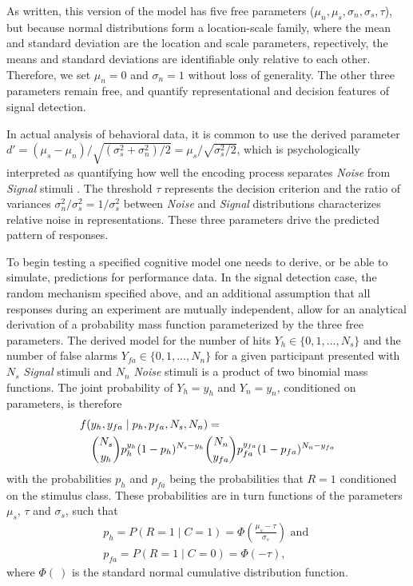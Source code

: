 \documentclass[12pt]{article}
\begin{document}
As written, this version of the model has five free
parameters ($\mu_n,\mu_s,\sigma_n,\sigma_s,\tau$), but
because normal distributions form a location-scale family, where the
mean and standard deviation are the location and scale parameters,
repectively, the means and standard deviations are identifiable only
relative to each other.  Therefore, we set $\mu_n = 0$ and $\sigma_n = 1$
without loss of generality. The other three parameters remain free,
and quantify representational and decision features of signal detection.

In actual analysis of behavioral data, it is common to use  the derived parameter $d' = (\mu_s - \mu_n)/\sqrt{(\sigma_s^2 + \sigma_n^2) / 2} = \mu_s/\sqrt{\sigma_s^2 / 2}$, which is psychologically interpreted as quantifying how well
the encoding process separates \textit{Noise} from \textit{Signal} stimuli \citep{MacCre2004}. 
The threshold
$\tau$ represents the decision criterion
%
and the ratio of variances
$\sigma_n^2/\sigma_s^2 = 1/\sigma_s^2$ between \textit{Noise}
and \textit{Signal} distributions characterizes relative noise in
representations. These three parameters drive the predicted pattern of
responses.
    
To begin testing a specified cognitive model one needs to derive, or be
able to simulate, predictions for performance data. In the signal detection
case, the random mechanism specified above, and an additional assumption
that all responses during an experiment are mutually independent, allow for
an analytical derivation of a probability mass function parameterized by
the three free parameters.  The derived model for the number of hits
$Y_h \in \{0, 1, \ldots, N_s\}$ and the number of false alarms $Y_{fa} \in
\{0, 1, \ldots, N_n\}$ for a given participant presented with $N_s$
\textit{Signal} stimuli and $N_n$ \textit{Noise} stimuli is a product of two binomial mass
functions. The joint probability of $Y_h=y_h$ and $Y_n=y_n$, conditioned on parameters, is therefore
%
\begin{eqnarray}
\lefteqn{f(y_h, y_{fa} \mid p_h, p_{fa}, N_s, N_n) = }\nonumber \\
& & \binom{N_s}{y_h}p_h^{y_h}(1 - p_{h})^{N_s - y_h}
\binom{N_n}{y_{fa}}p_{fa}^{y_{fa}}(1 - p_{fa})^{N_n - y_{fa}}
\end{eqnarray}
%
with the probabilities $p_h$ and $p_{fa}$ being the probabilities
that $R=1$ conditioned on the stimulus class.  These probabilities are in
turn functions of the parameters $\mu_s$, $\tau$ and $\sigma_s$, such that
%
\begin{align}\nonumber
p_h = P(R = 1 \mid C = 1) = \Phi\left(\frac{\mu_s - \tau}{\sigma_s}\right) \text{ and } \nonumber \\
p_{fa} = P(R = 1 \mid C = 0) = \Phi \left(-\tau\right),
\end{align}
where $\Phi(\:)$ is the standard normal cumulative distribution function.
    
\end{document}
